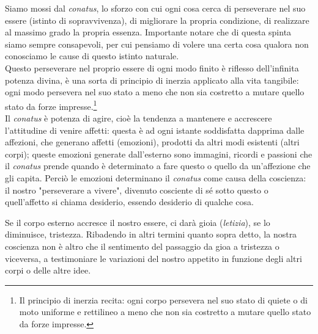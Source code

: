Siamo mossi dal \textit{conatus}, lo sforzo con cui ogni cosa cerca di perseverare nel suo essere (istinto di sopravvivenza), di migliorare la propria condizione, di realizzare al massimo grado la propria essenza. Importante notare che di questa spinta siamo sempre consapevoli, per cui pensiamo di volere una certa cosa qualora non conosciamo le cause di questo istinto naturale.\\
Questo perseverare nel proprio essere di ogni modo finito è riflesso dell'infinita potenza divina, è una sorta di principio di inerzia applicato alla vita tangibile: ogni modo persevera nel suo stato a meno che non sia costretto a mutare quello stato da forze impresse.\footnote{Il principio di inerzia recita: ogni corpo persevera nel suo stato di quiete o di moto uniforme e rettilineo a meno che non sia costretto a mutare quello stato da forze impresse.}\\
Il \textit{conatus} è potenza di agire, cioè la tendenza a mantenere e accrescere l'attitudine di venire affetti: questa è ad ogni istante soddisfatta dapprima dalle affezioni, che generano affetti (emozioni), prodotti da altri modi esistenti (altri corpi); queste emozioni generate dall'esterno sono immagini, ricordi e passioni che il \textit{conatus} prende quando è determinato a fare questo o quello da un'affezione che gli capita. Perciò le emozioni determinano il \textit{conatus} come causa della coscienza: il nostro "perseverare a vivere", divenuto cosciente di sé sotto questo o quell'affetto si chiama desiderio, essendo desiderio di qualche cosa.



Se il corpo esterno accresce il nostro essere, ci darà gioia (\textit{letizia}), se lo diminuisce, tristezza. Ribadendo in altri termini quanto sopra detto, la nostra coscienza non è altro che il sentimento del passaggio da gioa a tristezza o viceversa, a testimoniare le variazioni del nostro appetito in funzione degli altri corpi o delle altre idee.

